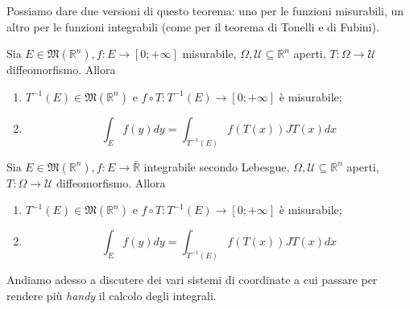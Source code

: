 Possiamo dare due versioni di questo teorema: uno per le funzioni misurabili, un altro per le funzioni integrabili (come per il teorema di Tonelli e di Fubini).
\begin{theorem}
	Sia $E \in \mathfrak{M}(\mathbb{R}^n), f: E \to [0; +\infty]$ misurabile, $\Omega, \mathcal{U} \subseteq \mathbb{R}^n$ aperti, $T: \Omega \to \mathcal{U}$ diffeomorfismo. Allora
	\begin{enumerate}[label=\protect\circled{\arabic*}]
		\item $T^{-1}(E) \in \mathfrak{M}(\mathbb{R}^n)$ e $f \circ T: T^{-1}(E) \to [0; +\infty]$ è misurabile;
		\item $$\int_E f(y)dy = \int_{T^{-1}(E)} f(T(x))JT(x)dx$$
	\end{enumerate}
\end{theorem}
\begin{theorem}
	Sia $E \in \mathfrak{M}(\mathbb{R}^n), f: E \to \bar{\mathbb{R}}$ integrabile secondo Lebesgue, $\Omega, \mathcal{U} \subseteq \mathbb{R}^n$ aperti, $T: \Omega \to \mathcal{U}$ diffeomorfismo. Allora
	\begin{enumerate}[label=\protect\circled{\arabic*}]
		\item $T^{-1}(E) \in \mathfrak{M}(\mathbb{R}^n)$ e $f \circ T: T^{-1}(E) \to [0; +\infty]$ è misurabile;
		\item $$\int_E f(y)dy = \int_{T^{-1}(E)} f(T(x))JT(x)dx$$
	\end{enumerate}
\end{theorem}
Andiamo adesso a discutere dei vari sistemi di coordinate a cui passare per rendere più \emph{handy} il calcolo degli integrali.
